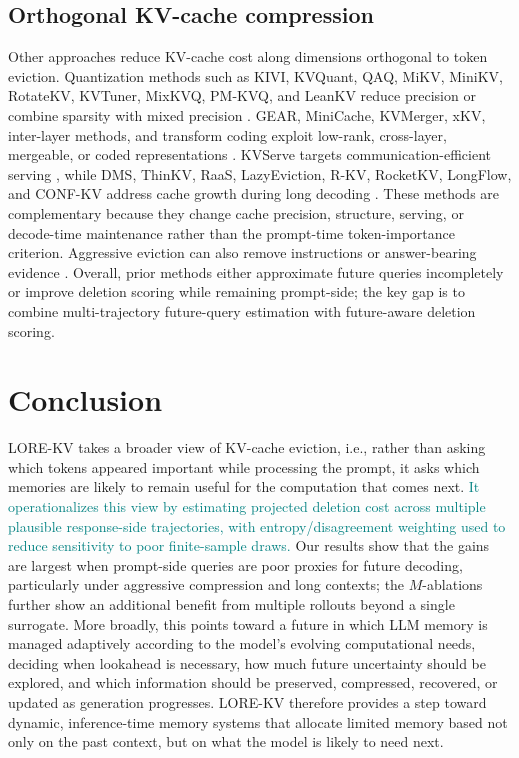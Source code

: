 \documentclass{article} %
\begin{document}
\subsection{Orthogonal KV-cache compression} \label{subsec:rw_orthogonal}
Other approaches reduce KV-cache cost along dimensions orthogonal to token eviction. Quantization methods such as KIVI, KVQuant, QAQ, MiKV, MiniKV, RotateKV, KVTuner, MixKVQ, PM-KVQ, and LeanKV reduce precision or combine sparsity with mixed precision \citep{liu2024kivi,hooper2024kvquant,dong2024qaq,yang2024notokenleft,sharma2024minikv,su2025rotatekv,li2025kvtuner,zhang2025mixkvq,liu2025pmkvq,10.1145/3731569.3764810}. GEAR, MiniCache, KVMerger, xKV, inter-layer methods, and transform coding exploit low-rank, cross-layer, mergeable, or coded representations \citep{kang2024gear,liu2024minicache,wang2024kvmerger,chang2025xkv,ma2024interlayer,staniszewski2026kv}. KVServe targets communication-efficient serving \citep{liu2026kvserve}, while DMS, ThinKV, RaaS, LazyEviction, R-KV, RocketKV, LongFlow, and CONF-KV address cache growth during long decoding \citep{lancucki2025hyperscaling,ramachandran2025thinkv,hu2025raas,zhang2025lazyevict,cai2025rkv,behnam2025rocketkv,su2026longflow,li2026confkv}. These methods are complementary because they change cache precision, structure, serving, or decode-time maintenance rather than the prompt-time token-importance criterion. Aggressive eviction can also remove instructions or answer-bearing evidence \citep{yang2024notokenleft,chen2025pitfalls,garcia2026protection}. Overall, prior methods either approximate future queries incompletely or improve deletion scoring while remaining prompt-side; the key gap is to combine multi-trajectory future-query estimation with future-aware deletion scoring.

\section{Conclusion} \label{sec:conclusion}

LORE-KV takes a broader view of KV-cache eviction, i.e., rather than asking which tokens appeared important while processing the prompt, it asks which memories are likely to remain useful for the computation that comes next. \textcolor{teal}{It operationalizes this view by estimating projected deletion cost across multiple plausible response-side trajectories, with entropy/disagreement weighting used to reduce sensitivity to poor finite-sample draws.} Our results show that the gains are largest when prompt-side queries are poor proxies for future decoding, particularly under aggressive compression and long contexts; the $M$-ablations further show an additional benefit from multiple rollouts beyond a single surrogate. More broadly, this points toward a future in which LLM memory is managed adaptively according to the model's evolving computational needs, deciding when lookahead is necessary, how much future uncertainty should be explored, and which information should be preserved, compressed, recovered, or updated as generation progresses. LORE-KV therefore provides a step toward dynamic, inference-time memory systems that allocate limited memory based not only on the past context, but on what the model is likely to need next.
\end{document}
